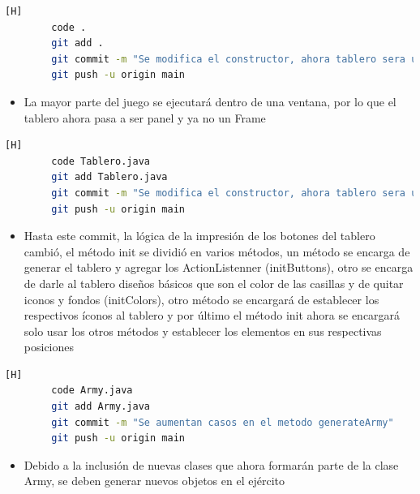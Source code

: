 \documentclass{article}
\begin{document}
	
	
	
	
		\begin{lstlisting}[language=bash,caption={Commit: 41fbe7f6cfb6f3a9ed93e734cc1129615769a755 }][H]
		code .
		git add .
		git commit -m "Se modifica el constructor, ahora tablero sera un JPanel y no Jframe"			
		git push -u origin main
	\end{lstlisting}
	
	
	\begin{itemize}
		\item La mayor parte del juego se ejecutará dentro de una ventana, por lo que el tablero ahora pasa a ser panel y ya no un Frame 
	\end{itemize}
	
	
	
			\begin{lstlisting}[language=bash,caption={Commit: d3787c582e7fe78b29932efece993e15635d97cb }][H]
		code Tablero.java
		git add Tablero.java
		git commit -m "Se modifica el constructor, ahora tablero sera un JPanel y no Jframe"			
		git push -u origin main
	\end{lstlisting}
	
	
	\begin{itemize}
		\item Hasta este commit, la lógica de la impresión de los botones del tablero cambió, el método init se dividió en varios métodos, un método se encarga de generar el tablero y agregar los ActionListenner (initButtons), otro se encarga de darle al tablero diseños básicos que son el color de las casillas y de quitar iconos y fondos (initColors), otro método se encargará de establecer los respectivos íconos al tablero  y por último el método init ahora se encargará solo usar los otros métodos y establecer los elementos en sus respectivas posiciones
	\end{itemize}
	
	
	
	
	
	
	
		
	
	
	\begin{lstlisting}[language=bash,caption={Commit: 7643af42beb4ad24f21cb0a786e1c33378d0d40c }][H]
		code Army.java
		git add Army.java
		git commit -m "Se aumentan casos en el metodo generateArmy"			
		git push -u origin main
	\end{lstlisting}
	
	
	\begin{itemize}
		\item Debido a la inclusión de nuevas clases que ahora formarán parte de la clase Army, se deben generar nuevos objetos en el ejército
	\end{itemize}
	
\end{document}
